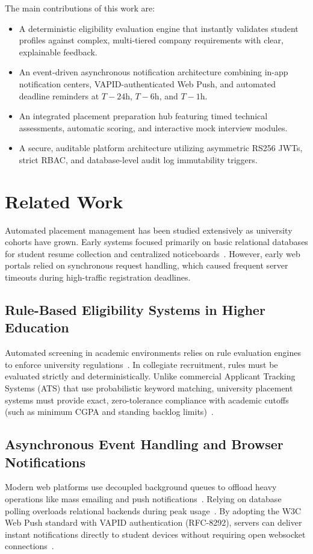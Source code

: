 \documentclass[conference]{IEEEtran}
\begin{document}
The main contributions of this work are:
\begin{itemize}
    \item A deterministic eligibility evaluation engine that instantly validates student profiles against complex, multi-tiered company requirements with clear, explainable feedback.
    \item An event-driven asynchronous notification architecture combining in-app notification centers, VAPID-authenticated Web Push, and automated deadline reminders at $T-24\text{h}$, $T-6\text{h}$, and $T-1\text{h}$.
    \item An integrated placement preparation hub featuring timed technical assessments, automatic scoring, and interactive mock interview modules.
    \item A secure, auditable platform architecture utilizing asymmetric RS256 JWTs, strict RBAC, and database-level audit log immutability triggers.
\end{itemize}

\section{Related Work}
Automated placement management has been studied extensively as university cohorts have grown. Early systems focused primarily on basic relational databases for student resume collection and centralized noticeboards~\cite{sharma2017design, ramesh2011performance}. However, early web portals relied on synchronous request handling, which caused frequent server timeouts during high-traffic registration deadlines.

\subsection{Rule-Based Eligibility Systems in Higher Education}
Automated screening in academic environments relies on rule evaluation engines to enforce university regulations~\cite{feyer2019automated, tsang1993foundations}. In collegiate recruitment, rules must be evaluated strictly and deterministically. Unlike commercial Applicant Tracking Systems (ATS) that use probabilistic keyword matching, university placement systems must provide exact, zero-tolerance compliance with academic cutoffs (such as minimum CGPA and standing backlog limits)~\cite{dasilva2021decision}.

\subsection{Asynchronous Event Handling and Browser Notifications}
Modern web platforms use decoupled background queues to offload heavy operations like mass emailing and push notifications~\cite{fowler2002patterns, hohpe2003enterprise}. Relying on database polling overloads relational backends during peak usage~\cite{newman2021building}. By adopting the W3C Web Push standard with VAPID authentication (RFC-8292), servers can deliver instant notifications directly to student devices without requiring open websocket connections~\cite{thomson2016generic, thomson2018voluntary}.
\end{document}
